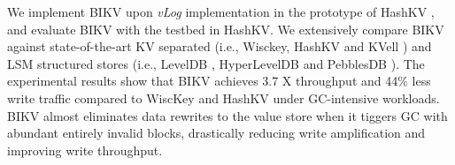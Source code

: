 \documentclass[sigconf]{acmart}
\begin{document}

We implement BIKV upon \textit{vLog} implementation in the prototype of HashKV \cite{HashKV}, and evaluate BIKV with the testbed in HashKV. We extensively compare BIKV against state-of-the-art KV separated (i.e., Wisckey, HashKV and KVell \cite{KVell}) and LSM structured stores (i.e., LevelDB \cite{LevelDB}, HyperLevelDB \cite{HyperLevelDB} and PebblesDB \cite{PebblesDB}). The experimental results show that BIKV achieves 3.7 X throughput and 44\% less write traffic compared to WiscKey and HashKV under GC-intensive workloads. BIKV almost eliminates data rewrites to the value store when it tiggers GC with abundant entirely invalid blocks, drastically reducing write amplification and improving write throughput.

\end{document}
